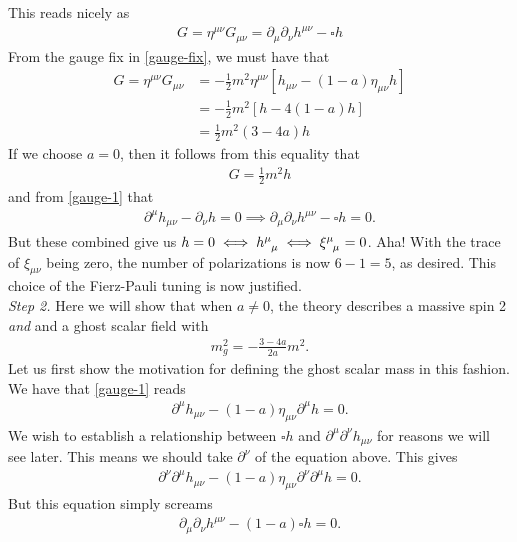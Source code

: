 \documentclass{book}
\theoremstyle{definition}
\newcommand{\p}{\partial}
\newcommand{\nn}{\nonumber}
\newcommand{\f}[2]{\frac{#1}{#2}}
\begin{document}
This reads nicely as
\begin{align}\label{munuG}
\boxed{G=  \eta^{\mu\nu}G_{\mu\nu} = \p_\mu \p_\nu h^{\mu\nu} - \square h}
\end{align}
From the gauge fix in \eqref{gauge-fix}, we must have that
\begin{align}\label{munuH}
G = \eta^{\mu\nu}G_{\mu\nu} &= -\f{1}{2}m^2\eta^{\mu\nu}[ h_{\mu\nu} -(1-a)\eta_{\mu\nu}h ]\nn\\
&= -\f{1}{2}m^2 [h - 4(1-a)h]\nn\\
&= \boxed{\f{1}{2}m^2 (3 - 4a)h}
\end{align}
If we choose $a = 0$, then it follows from this equality that
\begin{align}
G =\f{1}{2}m^2h 
\end{align}
and from \eqref{gauge-1} that   
\begin{align}
\p^\mu h_{\mu\nu} - \p_\nu h = 0 \implies \p_\mu \p_\nu h^{\mu\nu} - \square h = 0.
\end{align}
But these combined give us $h = 0 \iff \tensor{h}{^\mu_\mu} \iff \tensor{\xi}{^\mu_\mu} = 0$. Aha! With the trace of $\xi_{\mu\nu}$ being zero, the number of polarizations is now $6-1 = 5$, as desired. This choice of the Fierz-Pauli tuning is now justified.\\



















\textit{Step 2.} Here we will show that when $a\neq 0$, the theory describes a massive spin 2 \textit{and} and a ghost scalar field with
\begin{align}
m_g^2  = -\f{3-4a}{2a}m^2.
\end{align}
Let us first show the motivation for defining the ghost scalar mass in this fashion. We have that \eqref{gauge-1} reads
\begin{align}
\p^\mu h_{\mu\nu} - (1-a)\eta_{\mu\nu}\p^\mu h = 0.
\end{align}
We wish to establish a relationship between $\square h$ and $\p^\mu \p^\nu h_{\mu\nu}$ for reasons we will see later. This means we should take $\p^\nu$ of the equation above. This gives
\begin{align}
\p^\nu \p^\mu h_{\mu\nu} - (1-a)\eta_{\mu\nu}\p^\nu \p^\mu h = 0.
\end{align}
But this equation simply screams
\begin{align}\label{just-then}
\p_\mu \p_\nu h^{\mu\nu} - (1-a)\square h = 0.
\end{align}
\end{document}
